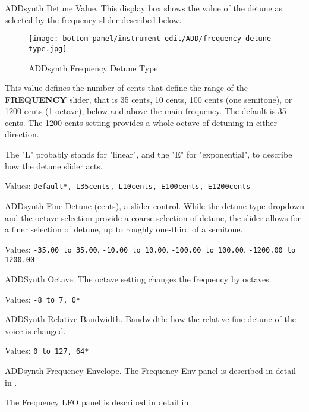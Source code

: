    \setcounter{ItemCounter}{0}      %

   ADDsynth Detune Value.
   This display box shows the value of the detune as selected by the
   frequency slider described below.

\begin{figure}[H]
   \centering 
   \texttt{[image: bottom-panel/instrument-edit/ADD/frequency-detune-type.jpg]}
   \caption{ADDsynth Frequency Detune Type}
   \label{fig:addsynth_freq_detune_type}
\end{figure}

   This value defines the number of cents that define the range of the
   \textbf{FREQUENCY} slider, that is 35 cents, 10 cents, 100 cents (one
   semitone), or 1200 cents (1 octave), below and above the main
   frequency.  The default is 35 cents.  The 1200-cents setting provides a
   whole octave of detuning in either direction.

   The "L" probably stands for "linear", and the "E" for "exponential", to
   describe how the detune slider acts.

   Values: \texttt{Default*, L35cents, L10cents, E100cents, E1200cents}

   ADDsynth Fine Detune (cents), a slider control.
   While the detune type dropdown and the octave selection provide a coarse
   selection of detune, the slider allows for a finer selection of detune,
   up to roughly one-third of a semitone.

   Values:
      \texttt{-35.00 to 35.00},
      \texttt{-10.00 to 10.00},
      \texttt{-100.00 to 100.00},
      \texttt{-1200.00 to 1200.00}

   ADDSynth Octave.
   The octave setting changes the frequency by octaves.

   Values: \texttt{-8 to 7, 0*}

   ADDSynth Relative Bandwidth.
   Bandwidth: how the relative fine detune of the voice is changed.

   Values: \texttt{0 to 127, 64*}

   ADDsynth Frequency Envelope.
   The Frequency Env panel is described in detail in
   .

   The Frequency LFO panel is described in detail in

